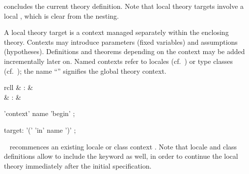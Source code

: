 \begin{isabellebody}
\begin{isamarkuptext}
\begin{description}
  \item \hyperlink{command.global.end}{\mbox{}} concludes the current theory
  definition.  Note that local theory targets involve a local
  \hyperlink{command.local.end}{\mbox{}}, which is clear from the nesting.

  \end{description}%
\end{isamarkuptext}%
\isamarkuptrue%
%
\isamarkuptrue%
%
\begin{isamarkuptext}%
A local theory target is a context managed separately within the
  enclosing theory.  Contexts may introduce parameters (fixed
  variables) and assumptions (hypotheses).  Definitions and theorems
  depending on the context may be added incrementally later on.  Named
  contexts refer to locales (cf.\ ) or type classes
  (cf.\ ); the name ``'' signifies the
  global theory context.

  \begin{matharray}{rcll}
    \hypertarget{command.context}{\hyperlink{command.context}{\mbox{}}} & : &  \\
    \hypertarget{command.local.end}{\hyperlink{command.local.end}{\mbox{}}} & : &  \\
  \end{matharray}

  \begin{rail}
    'context' name 'begin'
    ;

    target: '(' 'in' name ')'
    ;
  \end{rail}

  \begin{description}
  
  \item \hyperlink{command.context}{\mbox{}}~ recommences an
  existing locale or class context .  Note that locale and
  class definitions allow to include the \hyperlink{keyword.begin}{\mbox{}} keyword as
  well, in order to continue the local theory immediately after the
  initial specification.
  

\end{description}
\end{isamarkuptext}
\end{isabellebody}
